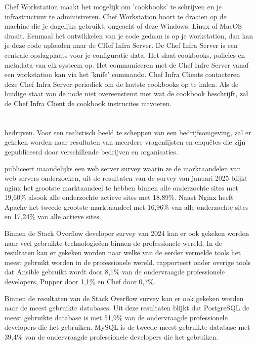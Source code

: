 Chef Workstation maakt het mogelijk om 'cookbooks' te schrijven en je infrastructuur te administreren. Chef Workstation hoort te draaien op de machine die je dagelijks gebruikt, ongeacht of deze Windows, Linux of MacOS draait.
Eenmaal het ontwikkelen van je code gedaan is op je workstation, dan kan je deze code uploaden naar de CHef Infra Server. De Chef Infra Server is een centrale opslagplaats voor je configuratie data. Het slaat cookbooks, policies en metadata van elk systeem op. Het communiceren met de Chef Infre Server vanaf een workstation kan via het 'knife' commando.
Chef Infra Clients contacteren deze Chef Infra Server periodiek om de laatste cookbooks op te halen. Als de huidige staat van de node niet overeenstemt met wat de cookbook beschrijft, zal de Chef Infra Client de cookbook instrucites uitvoeren. \autocite{Chef} \break

\section{}%
\label{sec:Infrastructuur studie}
bedrijven.
Voor een realistisch beeld te scheppen van een bedrijfsomgeving, zal er gekeken worden naar resultaten van meerdere vragenlijsten en enquêtes die zijn gepubliceerd door verschillende bedrijven en organisaties.

\textcite{NetcraftSurvey} publiceert maandelijks een web server survey waarin ze de marktaandelen van web servers onderzoeken, uit de resultaten van de survey van januari 2025 blijkt nginx het grootste marktaandeel te hebben binnen alle onderzochte sites met 19,60\% alsook alle onderzochte actieve sites met 18,89\%.
Naast Nginx heeft Apache het tweede grootste marktaandeel met 16,96\% van alle onderzochte sites en 17,24\% van alle actieve sites.

Binnen de Stack Overflow developer survey van 2024 kan er ook gekeken worden naar veel gebruikte technologieëen binnen de professionele wereld.
In de resultaten kan er gekeken worden naar welke van de eerder vermelde tools het meest gebruikt worden in de professionele wereld. \autocite{StackOverflowSurvey} rapporteert onder overige tools dat Ansible gebruikt wordt door 8,1\% van de ondervraagde professionele developers, Pupper door 1,1\% en Chef door 0,7\%. \break

Binnen de resultaten van de Stack Overflow survey kan er ook gekeken worden naar de meest gebruikte databases. Uit deze resultaten blijkt dat PostgreSQL de meest gebruikte database is met 51,9\% van de ondervraagde professionele developers die het gebruiken. MySQL is de tweede meest gebruikte database met 39,4\% van de ondervraagde professionele developers die het gebruiken. \autocite{StackOverflowSurvey} \break

